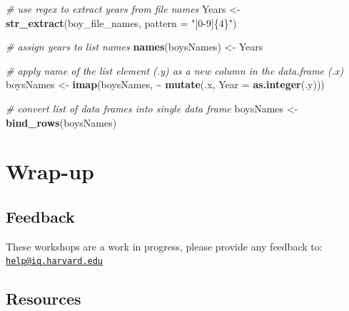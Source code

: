 \documentclass[
]{book}
\newenvironment{Shaded}{\begin{snugshade}}{\end{snugshade}}
\newcommand{\CommentTok}[1]{\textcolor[rgb]{0.56,0.35,0.01}{\textit{#1}}}
\newcommand{\DataTypeTok}[1]{\textcolor[rgb]{0.13,0.29,0.53}{#1}}
\newcommand{\KeywordTok}[1]{\textcolor[rgb]{0.13,0.29,0.53}{\textbf{#1}}}
\newcommand{\NormalTok}[1]{#1}
\newcommand{\OperatorTok}[1]{\textcolor[rgb]{0.81,0.36,0.00}{\textbf{#1}}}
\newcommand{\StringTok}[1]{\textcolor[rgb]{0.31,0.60,0.02}{#1}}
\begin{document}
\begin{Shaded}
\begin{Highlighting}[]
\CommentTok{\# use regex to extract years from file names}
\NormalTok{Years \textless{}{-}}\StringTok{ }\KeywordTok{str\_extract}\NormalTok{(boy\_file\_names, }\DataTypeTok{pattern =} \StringTok{"[0{-}9]\{4\}"}\NormalTok{)}

\CommentTok{\# assign years to list names}
\KeywordTok{names}\NormalTok{(boysNames) \textless{}{-}}\StringTok{ }\NormalTok{Years}

\CommentTok{\# apply name of the list element (.y) as a new column in the data.frame (.x)}
\NormalTok{boysNames \textless{}{-}}\StringTok{ }\KeywordTok{imap}\NormalTok{(boysNames, }\OperatorTok{\textasciitilde{}}\StringTok{ }\KeywordTok{mutate}\NormalTok{(.x, }\DataTypeTok{Year =} \KeywordTok{as.integer}\NormalTok{(.y)))}

\CommentTok{\# convert list of data frames into single data frame}
\NormalTok{boysNames \textless{}{-}}\StringTok{ }\KeywordTok{bind\_rows}\NormalTok{(boysNames)}
\end{Highlighting}
\end{Shaded}

\hypertarget{wrap-up-4}{%
\section{Wrap-up}\label{wrap-up-4}}

\hypertarget{feedback-4}{%
\subsection{Feedback}\label{feedback-4}}

These workshops are a work in progress, please provide any feedback to: \href{mailto:help@iq.harvard.edu}{\nolinkurl{help@iq.harvard.edu}}

\hypertarget{resources-5}{%
\subsection{Resources}\label{resources-5}}
\end{document}
